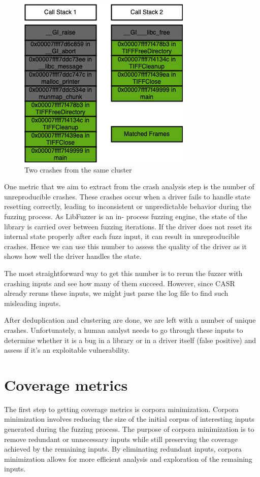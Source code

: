 \documentclass[a4paper,11pt,oneside]{report}
\begin{document}
\begin{figure}[htb]
	\centering
	\includegraphics[]{figures/callstacks.png}
	\caption{Two crashes from the same cluster}
	\label{fig:callstacks}
\end{figure}

One metric that we aim to extract from the crash analysis step is the 
number of unreproducible crashes. These crashes occur when a driver fails 
to handle state resetting correctly, leading to inconsistent or 
unpredictable behavior during the fuzzing process. As LibFuzzer is an in-
process fuzzing engine, the state of the library is carried over between 
fuzzing iterations. If the driver does not reset its internal state 
properly after each fuzz input, it can result in unreproducible crashes.
Hence we can use this number to assess the quality of the driver as it 
shows how well the driver handles the state. 

The most straightforward way to get this number is to rerun the fuzzer with 
crashing inputs and see how many of them succeed. However, since CASR
already reruns these inputs, we might just parse the log file to find such
misleading inputs.

After deduplication and clustering are done, we are left with a number of
unique crashes. Unfortunately, a human analyst needs to go through these
inputs to determine whether it is a bug in a library or in a driver 
itself (false positive) and assess if it's an exploitable vulnerability.

\section{Coverage metrics}
The first step to getting coverage metrics is corpora minimization. Corpora 
minimization involves reducing the size of the initial corpus of interesting 
inputs generated during the fuzzing process. The purpose of corpora minimization 
is to remove redundant or unnecessary inputs while still preserving the coverage 
achieved by the remaining inputs. By eliminating redundant inputs, corpora 
minimization allows for more efficient analysis and exploration of the remaining inputs.
\end{document}

